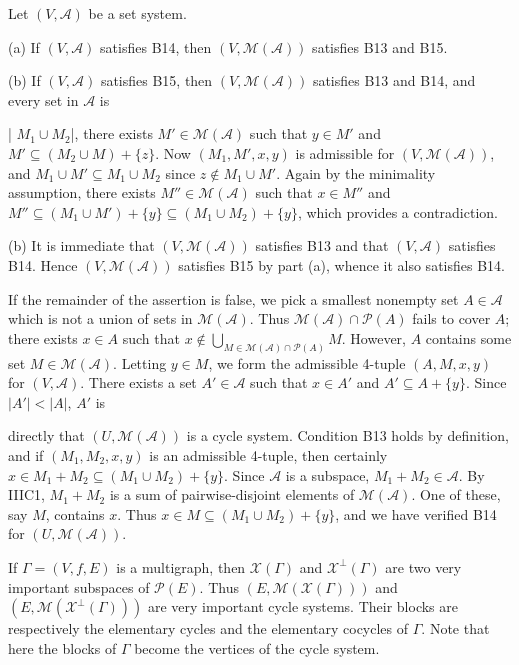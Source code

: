 Let $(V, \mathcal{A})$ be a set system.

(a) If $(V, \mathcal{A})$ satisfies B14, then $(V, \mathcal{M}(\mathcal{A}))$ satisfies B13 and B15.

(b) If $(V, \mathcal{A})$ satisfies B15, then $(V, \mathcal{M}(\mathcal{A}))$ satisfies B13 and B14, and every set in $\mathcal{A}$ is

| $M_1 \cup M_2$|, there exists $M' \in \mathcal{M}(\mathcal{A})$ such that $y \in M'$ and $M' \subseteq (M_2 \cup M) + \{z\}$. Now $(M_1, M', x, y)$ is admissible for $(V, \mathcal{M}(\mathcal{A}))$, and $M_1 \cup M' \subseteq M_1 \cup M_2$ since $z \notin M_1 \cup M'$. Again by the minimality assumption, there exists $M'' \in \mathcal{M}(\mathcal{A})$ such that $x \in M''$ and $M'' \subseteq (M_1 \cup M') + \{y\} \subseteq (M_1 \cup M_2) + \{y\}$, which provides a contradiction.

(b) It is immediate that $(V, \mathcal{M}(\mathcal{A}))$ satisfies B13 and that $(V, \mathcal{A})$ satisfies B14. Hence $(V, \mathcal{M}(\mathcal{A}))$ satisfies B15 by part (a), whence it also satisfies B14.

If the remainder of the assertion is false, we pick a smallest nonempty set $A \in \mathcal{A}$ which is not a union of sets in $\mathcal{M}(\mathcal{A})$. Thus $\mathcal{M}(\mathcal{A}) \cap \mathcal{P}(A)$ fails to cover $A$; there exists $x \in A$ such that $x \notin \bigcup_{M \in \mathcal{M}(\mathcal{A}) \cap \mathcal{P}(A)} M$. However, $A$ contains some set $M \in \mathcal{M}(\mathcal{A})$. Letting $y \in M$, we form the admissible 4-tuple $(A, M, x, y)$ for $(V, \mathcal{A})$. There exists a set $A' \in \mathcal{A}$ such that $x \in A'$ and $A' \subseteq A + \{y\}$. Since $|A'| < |A|$, $A'$ is

directly that $(U, \mathcal{M}(\mathcal{A}))$ is a cycle system. Condition B13 holds by definition, and if $(M_1, M_2, x, y)$ is an admissible 4-tuple, then certainly $x \in M_1 + M_2 \subseteq (M_1 \cup M_2) + \{y\}$. Since $\mathcal{A}$ is a subspace, $M_1 + M_2 \in \mathcal{A}$. By IIIC1, $M_1 + M_2$ is a sum of pairwise-disjoint elements of $\mathcal{M}(\mathcal{A})$. One of these, say $M$, contains $x$. Thus $x \in M \subseteq (M_1 \cup M_2) + \{y\}$, and we have verified B14 for $(U, \mathcal{M}(\mathcal{A}))$.

If $\Gamma = (V, f, E)$ is a multigraph, then $\mathcal{X}(\Gamma)$ and $\mathcal{X}^\perp(\Gamma)$ are two very important subspaces of $\mathcal{P}(E)$. Thus $(E, \mathcal{M}(\mathcal{X}(\Gamma)))$ and $(E, \mathcal{M}(\mathcal{X}^\perp(\Gamma)))$ are very important cycle systems. Their blocks are respectively the elementary cycles and the elementary cocycles of $\Gamma$. Note that here the blocks of $\Gamma$ become the vertices of the cycle system.
